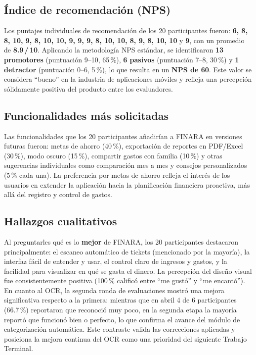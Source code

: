 \subsection{Índice de recomendación (NPS)}

Los puntajes individuales de recomendación de los 20 participantes fueron: \textbf{6, 8, 8, 10, 9, 8, 10, 10, 9, 9, 9, 8, 10, 10, 8, 9, 8, 10, 10} y \textbf{9}, con un promedio de \textbf{8.9\,/\,10}. Aplicando la metodología NPS estándar, se identificaron \textbf{13 promotores} (puntuación 9--10, 65\,\%), \textbf{6 pasivos} (puntuación 7--8, 30\,\%) y \textbf{1 detractor} (puntuación 0--6, 5\,\%), lo que resulta en un \textbf{NPS de 60}. Este valor se considera ``bueno'' en la industria de aplicaciones móviles y refleja una percepción sólidamente positiva del producto entre los evaluadores.

\subsection{Funcionalidades más solicitadas}

Las funcionalidades que los 20 participantes añadirían a FINARA en versiones futuras fueron: metas de ahorro (40\,\%), exportación de reportes en PDF/Excel (30\,\%), modo oscuro (15\,\%), compartir gastos con familia (10\,\%) y otras sugerencias individuales como comparación mes a mes y consejos personalizados (5\,\% cada una). La preferencia por metas de ahorro refleja el interés de los usuarios en extender la aplicación hacia la planificación financiera proactiva, más allá del registro y control de gastos.

\subsection{Hallazgos cualitativos}

Al preguntarles qué es lo \textbf{mejor} de FINARA, los 20 participantes destacaron principalmente: el escaneo automático de tickets (mencionado por la mayoría), la interfaz fácil de entender y usar, el control claro de ingresos y gastos, y la facilidad para visualizar en qué se gasta el dinero. La percepción del diseño visual fue consistentemente positiva (100\,\% calificó entre ``me gustó'' y ``me encantó''). En cuanto al OCR, la segunda ronda de evaluaciones mostró una mejora significativa respecto a la primera: mientras que en abril 4 de 6 participantes (66.7\,\%) reportaron que reconoció muy poco, en la segunda etapa la mayoría reportó que funcionó bien o perfecto, lo que confirma el avance del módulo de categorización automática. Este contraste valida las correcciones aplicadas y posiciona la mejora continua del OCR como una prioridad del siguiente Trabajo Terminal.
